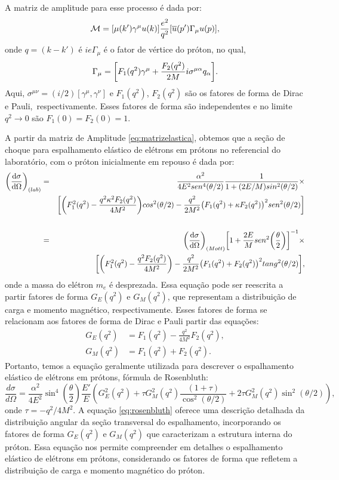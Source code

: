 A matriz de amplitude para esse processo é dada por:
\begin{equation}
\mathcal{M} = \qty[\mu (k')\gamma^\mu u(k)] \frac{e^2}{q^2} \qty[\overline{u}(p')\Gamma_\mu u(p)],
\label{eq:matrizelastica}
\end{equation}
onde $q=(k-k')$ é $ie\Gamma_\mu$ é o fator de vértice do próton, no qual,
\begin{equation}
    \Gamma_\mu = \qty[F_1(q^2)\gamma^\mu + \frac{F_2(q^2)}{2M}i \sigma^{\mu \alpha}q_\alpha ].
\end{equation}
Aqui, $\sigma^{\mu\nu} = (i/2)[\gamma^\mu, \gamma^\nu]$ e $F_1(q^2)$, $F_2(q^2)$ são os fatores de forma de Dirac e Pauli,~respectivamente. Esses fatores de forma são independentes e no limite  $q^2\rightarrow 0$ são $F_1(0)=F_2(0)=1$.

A partir da matriz de Amplitude \eqref{eq:matrizelastica},  obtemos que a seção de choque para  espalhamento elástico de elétrons em prótons no referencial do laboratório, com o próton inicialmente em repouso é dada por:
\begin{eqnarray}
    \qty(\dv{\sigma}{\Omega})_{(lab)}&=&\frac{\alpha^2 }{4 E^2 sen^4 (\theta/2)} \frac{1}{1+(2E/M)sin^2(\theta/2)}\times\nonumber\\&&\qty[\qty(F_1^2(q^2) - \frac{q^2 \kappa^2F_2(q^2)}{4M^2})cos^2\qty(\theta/2) - \frac{q^2}{2M^2}\qty(F_1(q^2) + \kappa F_2(q^2))^2 sen^2\qty(\theta/2)]
    \nonumber\\\nonumber\\
    &=&\qty(\dv{\sigma}{\Omega})_{(Mott)}\qty[1+\frac{2E}{M}sen^2 \qty(\frac{\theta}{2})]^{-1}\times\nonumber\\&&\qty[\qty(F_1^2(q^2) - \frac{q^2 F_2(q^2)}{4M^2}) - \frac{q^2}{2M^2}\qty(F_1(q^2) + F_2(q^2))^2 tang^2\qty(\theta/2)],
\end{eqnarray}
onde a massa do elétron $m_e$ é desprezada. Essa equação pode ser reescrita a partir fatores de forma $G_E(q^2)$ e $G_M(q^2)$, que representam a distribuição de carga e momento magnético, respectivamente. Esses fatores de forma se relacionam aos fatores de forma de Dirac e Pauli partir das equações:
\begin{align}
G_E(q^2) &= F_1(q^2) - \frac{q^2}{4M^2}F_2(q^2), \\
G_M(q^2) &= F_1(q^2) + F_2(q^2).
\end{align}
Portanto, temos a equação geralmente utilizada para descrever o espalhamento elástico de elétrons em prótons,  fórmula de Rosenbluth:
\begin{equation}
\frac{d\sigma}{d\Omega} = \frac{\alpha^2}{4E^2}\sin^4\left(\frac{\theta}{2}\right)\frac{E'}{E}\left(G_E^2(q^2) + \tau G_M^2(q^2)\frac{(1 + \tau)}{\cos^2(\theta/2)} + 2\tau G_M^2(q^2)\sin^2(\theta/2)\right),
\label{eq:rosenbluth}
\end{equation}
onde $\tau = -q^2/4M^2$. A equação \eqref{eq:rosenbluth} oferece uma descrição detalhada da distribuição angular da seção transversal do espalhamento, incorporando os fatores de forma $G_E(q^2)$ e $G_M(q^2)$ que caracterizam a estrutura interna do próton. Essa equação nos permite compreender em detalhes o espalhamento elástico de elétrons em prótons, considerando os fatores de forma que refletem a distribuição de carga e momento magnético do próton.

